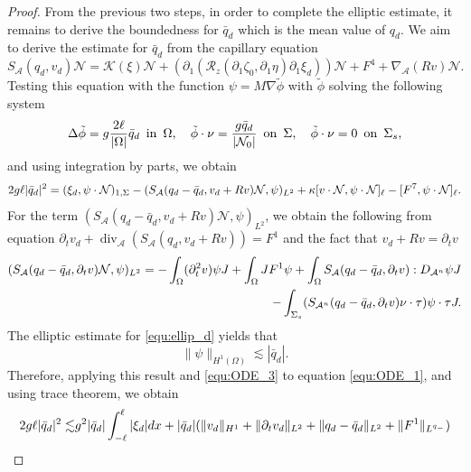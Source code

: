 \documentclass[letterpaper,reqno,10pt,twoside]{amsart}
\theoremstyle{definition}
\theoremstyle{remark}
\def\p{\partial}
\begin{document}
\begin{proof}
		{From the previous two steps, in order to complete the elliptic estimate, it remains to derive the boundedness for $\bar{q}_{d}$ which is the mean value of $q_{d}$. We aim to derive the estimate for $\bar{q}_{d}$ from the capillary equation
			\[
			S_{\mathcal{A}}(q_{d},v_{d})\mathcal{N}=\mathcal{K}(\xi)\mathcal{N}+(\p_{1}(\mathcal{R}_{z}(\p_{1}\zeta_{0},\p_{1}\eta)\p_{1}\xi_{d}))\mathcal{N}+F^{4}+\nabla_{\mathcal{A}}(Rv)\mathcal{N}.
			\]
			Testing this equation with the function $\psi=M\nabla\tilde{\phi}$ with $\tilde{\phi}$ solving the following system
			\begin{align}{\label{equ:ellip_d}}
				\Delta\tilde{\phi}=g\frac{2\ell}{|\Omega|}\bar{q}_{d} ~\operatorname{in}~\Omega,\quad\tilde{\phi}\cdot\nu=\frac{g\bar{q}_{d}}{|\mathcal{N}_{0}|}~\operatorname{on}~\Sigma,\quad\tilde{\phi}\cdot \nu=0~\operatorname{on}~\Sigma_{s},
			\end{align}
			and using integration by parts, we obtain
			\begin{align}{\label{equ:ODE_1}}
				2g\ell|\bar{q}_{d}|^{2}=(\xi_{d},\psi\cdot \mathcal{N})_{1,\Sigma}-(S_{\mathcal{A}}(q_{d}-\bar{q}_{d},v_{d}+Rv)\mathcal{N},\psi)_{L^{2}}+\kappa[v\cdot \mathcal{N},\psi\cdot \mathcal{N}]_{\ell}-[F^{7},\psi\cdot \mathcal{N}]_{\ell}.
			\end{align}
			For the term $(S_{\mathcal{A}}(q_{d}-\bar{q}_{d},v_{d}+Rv)\mathcal{N},\psi)_{L^{2}}$, we obtain the following from equation $\p_{t}v_{d}+\operatorname{div}_{\mathcal{A}}(S_{\mathcal{A}}  (q_{d},v_{d}+Rv))=F^{1}$ and the fact that $v_{d}+Rv=\p_{t}v$
			\begin{align}{\label{equ:ODE_3}}
				\begin{aligned}
					(S_{\mathcal{A}}(q_{d}-\bar{q}_{d},\p_{t}v)\mathcal{N},\psi)_{L^{2}}=-\int_{\Omega}(\p_{t}^{2}v)\psi J+\int_{\Omega} JF^{1}\psi+\int_{\Omega} S_{\mathcal{A}}(q_{d}-\bar{q}_{d},\p_{t}v):D_{\mathcal{A}^{n}}\psi J\\
					-\int_{\Sigma_{s}}(S_{\mathcal{A}^{n}}(q_{d}-\bar{q}_{d},\p_{t}v)\nu\cdot \tau)\psi\cdot \tau J.
				\end{aligned}
			\end{align}
			The elliptic estimate for \eqref{equ:ellip_d} yields that
			\[
			\|\psi\|_{H^{1}(\Omega)}\lesssim |\bar{q}_{d}|.
			\]
			Therefore, applying this result and \eqref{equ:ODE_3} to equation \eqref{equ:ODE_1}, and using trace theorem, we obtain
			\[\begin{aligned}
				2g\ell|\bar{q}_{d}|^{2}\lesssim& g^{2}|\bar{q}_{d}|\int_{-\ell}^{\ell}|\xi_{d}|dx+|\bar{q}_{d}|(\|v_{d}\|_{H^{1}}+\|\p_{t}v_{d}\|_{L^{2}}+\|q_{d}-\bar{q}_{d}\|_{L^{2}}+\|F^{1}\|_{L^{q_-}})\notag\\

\end{aligned}\]}
\end{proof}
\end{document}
